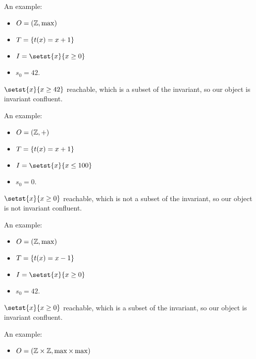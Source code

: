 

\begin{frame}
  \Large
  An example:
  \begin{itemize}
    \item $O = (\mathbb{Z}, \max)$
    \item $T = \{t(x) = x + 1\}$
    \item $I = \setst{x}{x \geq 0}$
    \item $s_0 = 42$.
  \end{itemize}

  \pause

  $\setst{x}{x \geq 42}$ reachable, which is a subset of the invariant, so our
  object is invariant confluent.
\end{frame}

\begin{frame}
  \Large
  An example:
  \begin{itemize}
    \item $O = (\mathbb{Z}, +)$
    \item $T = \{t(x) = x + 1\}$
    \item $I = \setst{x}{x \leq 100}$
    \item $s_0 = 0$.
  \end{itemize}

  \pause

  $\setst{x}{x \geq 0}$ reachable, which is not a subset of the invariant, so
  our object is not invariant confluent.
\end{frame}

\begin{frame}
  \Large
  An example:
  \begin{itemize}
    \item $O = (\mathbb{Z}, \max)$
    \item $T = \{t(x) = x - 1\}$
    \item $I = \setst{x}{x \geq 0}$
    \item $s_0 = 42$.
  \end{itemize}

  \pause

  $\setst{x}{x \geq 0}$ reachable, which is a subset of the invariant, so our
  object is invariant confluent.
\end{frame}

\begin{frame}
  \Large
  An example:
  \begin{itemize}
    \item $O = (\mathbb{Z} \times \mathbb{Z}, \max \times \max)$
  \end{itemize}

\end{frame}

